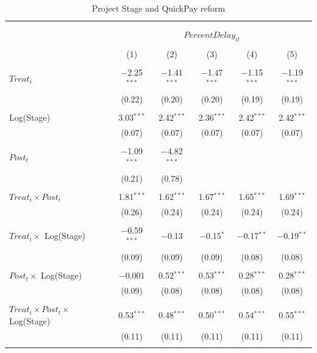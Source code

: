 \documentclass[
]{article}
\begin{document}
\begin{table}[H] \centering 
  \caption{Project Stage and QuickPay reform} 
  \label{} 
\small 
\begin{tabular}{@{\extracolsep{-2pt}}lccccc} 
\\[-1.8ex]\hline 
\hline \\[-1.8ex] 
\\[-1.8ex] & \multicolumn{5}{c}{$PercentDelay_{it}$  } \\ 
\\[-1.8ex] & (1) & (2) & (3) & (4) & (5)\\ 
\hline \\[-1.8ex] 
 $Treat_i$ & $-$2.25$^{***}$ & $-$1.41$^{***}$ & $-$1.47$^{***}$ & $-$1.15$^{***}$ & $-$1.19$^{***}$ \\ 
  & (0.22) & (0.20) & (0.20) & (0.19) & (0.19) \\ 
  & & & & & \\ 
 Log(Stage) & 3.03$^{***}$ & 2.42$^{***}$ & 2.36$^{***}$ & 2.42$^{***}$ & 2.42$^{***}$ \\ 
  & (0.07) & (0.07) & (0.07) & (0.07) & (0.07) \\ 
  & & & & & \\ 
 $Post_t$ & $-$1.09$^{***}$ & $-$4.82$^{***}$ &  &  &  \\ 
  & (0.21) & (0.78) &  &  &  \\ 
  & & & & & \\ 
 $Treat_i \times Post_t$ & 1.81$^{***}$ & 1.62$^{***}$ & 1.67$^{***}$ & 1.65$^{***}$ & 1.69$^{***}$ \\ 
  & (0.26) & (0.24) & (0.24) & (0.24) & (0.24) \\ 
  & & & & & \\ 
 $Treat_i \times$ Log(Stage) & $-$0.59$^{***}$ & $-$0.13 & $-$0.15$^{*}$ & $-$0.17$^{**}$ & $-$0.19$^{**}$ \\ 
  & (0.09) & (0.09) & (0.09) & (0.08) & (0.08) \\ 
  & & & & & \\ 
 $Post_t \times$ Log(Stage) & $-$0.001 & 0.52$^{***}$ & 0.53$^{***}$ & 0.28$^{***}$ & 0.28$^{***}$ \\ 
  & (0.09) & (0.08) & (0.08) & (0.08) & (0.08) \\ 
  & & & & & \\ 
 $Treat_i \times Post_t \times$ Log(Stage) & 0.53$^{***}$ & 0.48$^{***}$ & 0.50$^{***}$ & 0.54$^{***}$ & 0.55$^{***}$ \\ 
  & (0.11) & (0.11) & (0.11) & (0.11) & (0.11) \\ 
  & & & & & \\ 

\end{tabular}
\end{table}
\end{document}
